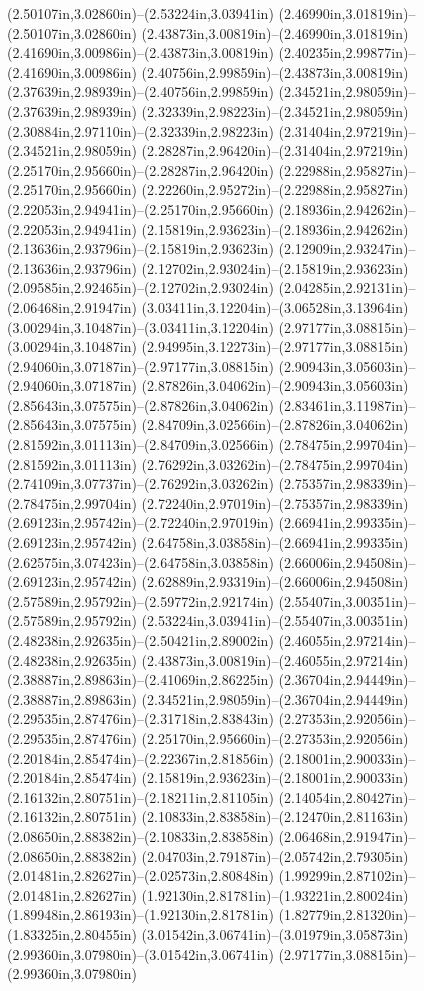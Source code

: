 (2.50107in,3.02860in)--(2.53224in,3.03941in) (2.46990in,3.01819in)--(2.50107in,3.02860in) (2.43873in,3.00819in)--(2.46990in,3.01819in) (2.41690in,3.00986in)--(2.43873in,3.00819in) (2.40235in,2.99877in)--(2.41690in,3.00986in) (2.40756in,2.99859in)--(2.43873in,3.00819in) (2.37639in,2.98939in)--(2.40756in,2.99859in) (2.34521in,2.98059in)--(2.37639in,2.98939in) (2.32339in,2.98223in)--(2.34521in,2.98059in) (2.30884in,2.97110in)--(2.32339in,2.98223in) (2.31404in,2.97219in)--(2.34521in,2.98059in) (2.28287in,2.96420in)--(2.31404in,2.97219in) (2.25170in,2.95660in)--(2.28287in,2.96420in) (2.22988in,2.95827in)--(2.25170in,2.95660in) (2.22260in,2.95272in)--(2.22988in,2.95827in) (2.22053in,2.94941in)--(2.25170in,2.95660in) (2.18936in,2.94262in)--(2.22053in,2.94941in) (2.15819in,2.93623in)--(2.18936in,2.94262in) (2.13636in,2.93796in)--(2.15819in,2.93623in) (2.12909in,2.93247in)--(2.13636in,2.93796in) (2.12702in,2.93024in)--(2.15819in,2.93623in) (2.09585in,2.92465in)--(2.12702in,2.93024in) (2.04285in,2.92131in)--(2.06468in,2.91947in) (3.03411in,3.12204in)--(3.06528in,3.13964in) (3.00294in,3.10487in)--(3.03411in,3.12204in) (2.97177in,3.08815in)--(3.00294in,3.10487in) (2.94995in,3.12273in)--(2.97177in,3.08815in) (2.94060in,3.07187in)--(2.97177in,3.08815in) (2.90943in,3.05603in)--(2.94060in,3.07187in) (2.87826in,3.04062in)--(2.90943in,3.05603in) (2.85643in,3.07575in)--(2.87826in,3.04062in) (2.83461in,3.11987in)--(2.85643in,3.07575in) (2.84709in,3.02566in)--(2.87826in,3.04062in) (2.81592in,3.01113in)--(2.84709in,3.02566in) (2.78475in,2.99704in)--(2.81592in,3.01113in) (2.76292in,3.03262in)--(2.78475in,2.99704in) (2.74109in,3.07737in)--(2.76292in,3.03262in) (2.75357in,2.98339in)--(2.78475in,2.99704in) (2.72240in,2.97019in)--(2.75357in,2.98339in) (2.69123in,2.95742in)--(2.72240in,2.97019in) (2.66941in,2.99335in)--(2.69123in,2.95742in) (2.64758in,3.03858in)--(2.66941in,2.99335in) (2.62575in,3.07423in)--(2.64758in,3.03858in) (2.66006in,2.94508in)--(2.69123in,2.95742in) (2.62889in,2.93319in)--(2.66006in,2.94508in) (2.57589in,2.95792in)--(2.59772in,2.92174in) (2.55407in,3.00351in)--(2.57589in,2.95792in) (2.53224in,3.03941in)--(2.55407in,3.00351in) (2.48238in,2.92635in)--(2.50421in,2.89002in) (2.46055in,2.97214in)--(2.48238in,2.92635in) (2.43873in,3.00819in)--(2.46055in,2.97214in) (2.38887in,2.89863in)--(2.41069in,2.86225in) (2.36704in,2.94449in)--(2.38887in,2.89863in) (2.34521in,2.98059in)--(2.36704in,2.94449in) (2.29535in,2.87476in)--(2.31718in,2.83843in) (2.27353in,2.92056in)--(2.29535in,2.87476in) (2.25170in,2.95660in)--(2.27353in,2.92056in) (2.20184in,2.85474in)--(2.22367in,2.81856in) (2.18001in,2.90033in)--(2.20184in,2.85474in) (2.15819in,2.93623in)--(2.18001in,2.90033in) (2.16132in,2.80751in)--(2.18211in,2.81105in) (2.14054in,2.80427in)--(2.16132in,2.80751in) (2.10833in,2.83858in)--(2.12470in,2.81163in) (2.08650in,2.88382in)--(2.10833in,2.83858in) (2.06468in,2.91947in)--(2.08650in,2.88382in) (2.04703in,2.79187in)--(2.05742in,2.79305in) (2.01481in,2.82627in)--(2.02573in,2.80848in) (1.99299in,2.87102in)--(2.01481in,2.82627in) (1.92130in,2.81781in)--(1.93221in,2.80024in) (1.89948in,2.86193in)--(1.92130in,2.81781in) (1.82779in,2.81320in)--(1.83325in,2.80455in) (3.01542in,3.06741in)--(3.01979in,3.05873in) (2.99360in,3.07980in)--(3.01542in,3.06741in) (2.97177in,3.08815in)--(2.99360in,3.07980in) 